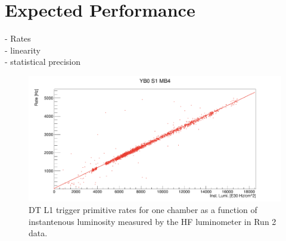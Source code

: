 \section{Expected Performance}
- Rates \\ 
- linearity \\
- statistical precision 





\begin{figure}[hbtp]
\centering
\includegraphics[width=.7\linewidth]{tex/Part2/fig/DT/DT-Linearity.png}
\caption{DT L1 trigger primitive rates for one chamber  as a function of instantenous luminosity measured by the HF luminometer in Run 2 data.} 
\label{fig:DT_linearity}
\end{figure}


